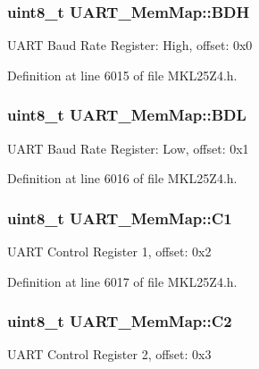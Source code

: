\subsubsection[{\texorpdfstring{B\+DH}{BDH}}]{\setlength{\rightskip}{0pt plus 5cm}uint8\+\_\+t U\+A\+R\+T\+\_\+\+Mem\+Map\+::\+B\+DH}\hypertarget{struct_u_a_r_t___mem_map_a50621a015b23211a706aa74180fa4689}{}\label{struct_u_a_r_t___mem_map_a50621a015b23211a706aa74180fa4689}
U\+A\+RT Baud Rate Register\+: High, offset\+: 0x0 

Definition at line 6015 of file M\+K\+L25\+Z4.\+h.

\subsubsection[{\texorpdfstring{B\+DL}{BDL}}]{\setlength{\rightskip}{0pt plus 5cm}uint8\+\_\+t U\+A\+R\+T\+\_\+\+Mem\+Map\+::\+B\+DL}\hypertarget{struct_u_a_r_t___mem_map_ac846186ffd0e53fbac32cd57c6f9acc4}{}\label{struct_u_a_r_t___mem_map_ac846186ffd0e53fbac32cd57c6f9acc4}
U\+A\+RT Baud Rate Register\+: Low, offset\+: 0x1 

Definition at line 6016 of file M\+K\+L25\+Z4.\+h.

\subsubsection[{\texorpdfstring{C1}{C1}}]{\setlength{\rightskip}{0pt plus 5cm}uint8\+\_\+t U\+A\+R\+T\+\_\+\+Mem\+Map\+::\+C1}\hypertarget{struct_u_a_r_t___mem_map_ac2300c7c40e63ca712d0ec5180332f4b}{}\label{struct_u_a_r_t___mem_map_ac2300c7c40e63ca712d0ec5180332f4b}
U\+A\+RT Control Register 1, offset\+: 0x2 

Definition at line 6017 of file M\+K\+L25\+Z4.\+h.

\subsubsection[{\texorpdfstring{C2}{C2}}]{\setlength{\rightskip}{0pt plus 5cm}uint8\+\_\+t U\+A\+R\+T\+\_\+\+Mem\+Map\+::\+C2}\hypertarget{struct_u_a_r_t___mem_map_a3e49aeb27f3613fd01a17a3c76e785b7}{}\label{struct_u_a_r_t___mem_map_a3e49aeb27f3613fd01a17a3c76e785b7}
U\+A\+RT Control Register 2, offset\+: 0x3 


